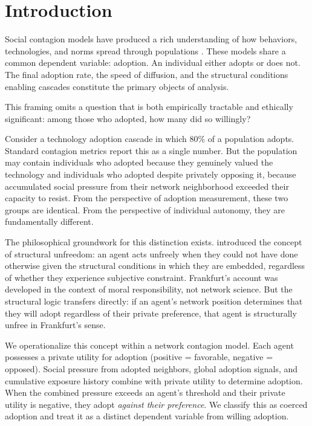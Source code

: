 \documentclass[11pt, a4paper]{article}
\begin{document}
\clearpage

\section{Introduction}
\label{sec:introduction}

Social contagion models have produced a rich understanding of how behaviors, technologies, and norms spread through populations \citep{granovetter1978threshold, watts2002simple, centola2007complex}. These models share a common dependent variable: adoption. An individual either adopts or does not. The final adoption rate, the speed of diffusion, and the structural conditions enabling cascades constitute the primary objects of analysis.

This framing omits a question that is both empirically tractable and ethically significant: among those who adopted, how many did so willingly?

Consider a technology adoption cascade in which 80\% of a population adopts. Standard contagion metrics report this as a single number. But the population may contain individuals who adopted because they genuinely valued the technology and individuals who adopted despite privately opposing it, because accumulated social pressure from their network neighborhood exceeded their capacity to resist. From the perspective of adoption measurement, these two groups are identical. From the perspective of individual autonomy, they are fundamentally different.

The philosophical groundwork for this distinction exists. \citet{frankfurt1971freedom} introduced the concept of structural unfreedom: an agent acts unfreely when they could not have done otherwise given the structural conditions in which they are embedded, regardless of whether they experience subjective constraint. Frankfurt's account was developed in the context of moral responsibility, not network science. But the structural logic transfers directly: if an agent's network position determines that they will adopt regardless of their private preference, that agent is structurally unfree in Frankfurt's sense.

We operationalize this concept within a network contagion model. Each agent possesses a private utility for adoption (positive = favorable, negative = opposed). Social pressure from adopted neighbors, global adoption signals, and cumulative exposure history combine with private utility to determine adoption. When the combined pressure exceeds an agent's threshold and their private utility is negative, they adopt \textit{against their preference}. We classify this as coerced adoption and treat it as a distinct dependent variable from willing adoption.
\end{document}
